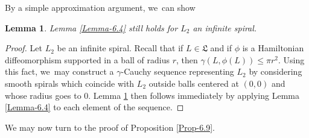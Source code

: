 \documentclass[10pt]{amsart}
\newtheorem{lem}[thm]{Lemma}
\theoremstyle{definition}
\newcommand{\fL}{\mathfrak {L}}
\begin{document}
By a simple approximation argument, we~can show
\begin{lem} \label{Lemma-6.4-for-infinite-spirals} Lemma \ref{Lemma-6.4} still holds for $L_2$ an infinite spiral.
\end{lem}

\begin{proof} Let $L_2$ be an infinite spiral. Recall that if $L\in\fL$ and if $\phi$ is a Hamiltonian diffeomorphism supported in a ball of radius $r$, then $\gamma(L, \phi(L))\leq \pi r^2$. Using this fact, we~may construct a $\gamma$\nobreakdash-Cauchy sequence representing $L_2$ by considering smooth spirals which coincide with $L_2$ outside balls centered at $(0,0)$ and whose radius goes to $0$. Lemma \ref{Lemma-6.4-for-infinite-spirals} then follows immediately by applying Lemma \ref{Lemma-6.4} to each element of the sequence.
\end{proof}

We may now turn to the proof of Proposition \ref{Prop-6.9}.
\end{document}
